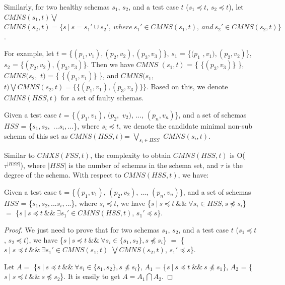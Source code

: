 {Similarly, for two healthy schemas $s_{1}$, $s_{2}$, and a test case $t$ ($s_{1} \preceq t$, $s_{2} \preceq t$), let $CMNS(s_{1}, t) \bigvee $ $CMNS(s_{2}, t)  = \{ s\ |\ s = s_{1}' \cup s_{2}',\ where\ s_{1}' \in CMNS(s_{1}, t),\ and\ s_{2}' \in CMNS(s_{2}, t) \}$.

For example, let $t$ = \{$(p_{1},v_{1}), (p_{2}, v_{2}), (p_{3}, v_{3})$\}, $s_{1}$ = \{$(p_{1}$ $, v_{1}), (p_{2}, v_{2})$\}, $s_{2}$ = \{$(p_{2}, v_{2}), (p_{3}, v_{3})$\}. Then we have $CMNS$ $(s_{1}, t)$ = \{ \{$(p_{3}, v_{3})$\} \}, $CMNS(s_{2},$ $ t)$ = \{ \{$(p_{1}, v_{1})$\} \}, and  $CMNS(s_{1},$ $ t) \bigvee CMNS(s_{2}, t) = \{ \{(p_{1}, v_{1}), (p_{3}, v_{3})\} \} $. Based on this, we denote $CMNS(HSS,t)$ for a set of faulty schemas.


\begin{definition}
Given a test case $t$ = \{$(p_{1}, v_{1})$, $(p_{2}, $ $v_{2})$, ..., $(p_{n}, v_{n})$\}, and a set of schemas $HSS$ = \{$s_{1} , s_{2},$ $  ...s_{i}, ...$\}, where $ s_{i} \preceq t$, we denote the candidate minimal non-sub schema of this set as $CMNS(HSS,t)$=  $\bigvee_{s_{i}\in HSS}$ $ CMNS(s_{i}, t)$.
\end{definition}

Similar to $CMXS(FSS,t)$, the complexity to obtain $CMNS(HSS,t)$ is O($\tau^{|HSS|}$), where $|HSS|$ is the number of schemas in the schema set, and $\tau$ is the degree of the schema. With respect to $CMNS(HSS,t)$, we have:

\begin{proposition}\label{pro:superofCMNS2}
Given a test case t = \{$(p_{1}, v_{1})$, $(p_{2}, v_{2})$, ..., $(p_{n}, v_{n})$\}, and a set of schemas $HSS$ = \{$s_{1} , s_{2}, ... s_{i}, ...$\}, where $s_{i} \preceq t$,  we have \{$s\ |\ s \preceq t\ \&\&\ \forall s_{i} \in HSS, s \npreceq s_{i} $\} $=$  \{$ s\ |\ s \preceq t \ \&\& \ \exists s_{1}' \in CMNS(HSS, t)$, $s_{1}' \preceq s$\}.
\end{proposition}

\begin{proof}
We just need to prove that for two schemas $s_{1}$, $s_{2}$, and a test case $t$ ($s_{1} \preceq t$, $s_{2} \preceq t$), we have \{$s\ |\ s \preceq t\ \&\&\ \forall s_{i} \in \{s_{1}, s_{2}\}, s \npreceq s_{i} $\} $=$  \{$ s\ |\ s \preceq t \ \&\&\  \exists s_{1}' \in CMNS(s_{1}, t)$ $ \bigvee CMNS(s_{2}, t)$, $s_{1}' \preceq s$\}.

Let $A = $ \{$s\ |\ s \preceq t\ \&\&\ \forall s_{i} \in \{s_{1}, s_{2}\}, s \npreceq s_{i} $\}, $A_{1}$ = \{$s\ |\ s \preceq t\ \&\&\  s \npreceq s_{1} $\}, $A_{2}$ = \{$s\ |\ s \preceq t\ \&\&\  s \npreceq s_{2} $\}. It is easily to get $A = A_{1} \bigcap A_{2}$.


\end{proof}}
